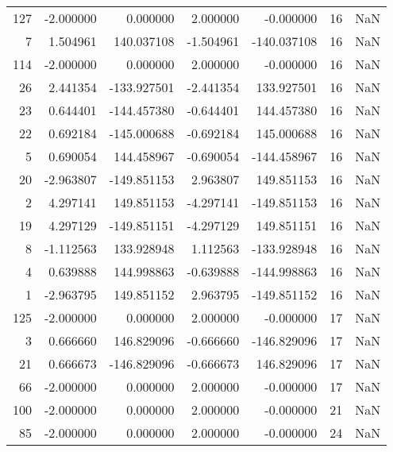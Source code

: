 \begin{tabular}{rrrrrrr}
127 & -2.000000 &    0.000000 &  2.000000 &   -0.000000 &          16 & NaN \\
  7 &  1.504961 &  140.037108 & -1.504961 & -140.037108 &          16 & NaN \\
114 & -2.000000 &    0.000000 &  2.000000 &   -0.000000 &          16 & NaN \\
 26 &  2.441354 & -133.927501 & -2.441354 &  133.927501 &          16 & NaN \\
 23 &  0.644401 & -144.457380 & -0.644401 &  144.457380 &          16 & NaN \\
 22 &  0.692184 & -145.000688 & -0.692184 &  145.000688 &          16 & NaN \\
  5 &  0.690054 &  144.458967 & -0.690054 & -144.458967 &          16 & NaN \\
 20 & -2.963807 & -149.851153 &  2.963807 &  149.851153 &          16 & NaN \\
  2 &  4.297141 &  149.851153 & -4.297141 & -149.851153 &          16 & NaN \\
 19 &  4.297129 & -149.851151 & -4.297129 &  149.851151 &          16 & NaN \\
  8 & -1.112563 &  133.928948 &  1.112563 & -133.928948 &          16 & NaN \\
  4 &  0.639888 &  144.998863 & -0.639888 & -144.998863 &          16 & NaN \\
  1 & -2.963795 &  149.851152 &  2.963795 & -149.851152 &          16 & NaN \\
125 & -2.000000 &    0.000000 &  2.000000 &   -0.000000 &          17 & NaN \\
  3 &  0.666660 &  146.829096 & -0.666660 & -146.829096 &          17 & NaN \\
 21 &  0.666673 & -146.829096 & -0.666673 &  146.829096 &          17 & NaN \\
 66 & -2.000000 &    0.000000 &  2.000000 &   -0.000000 &          17 & NaN \\
100 & -2.000000 &    0.000000 &  2.000000 &   -0.000000 &          21 & NaN \\
 85 & -2.000000 &    0.000000 &  2.000000 &   -0.000000 &          24 & NaN \\
\bottomrule
\end{tabular}
